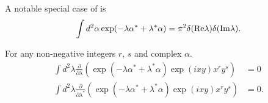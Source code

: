 A notable special case of  is
\[
	\int d^2\alpha \exp(-\lambda \alpha^* + \lambda^* \alpha)
	= \pi^2 \delta(\mathrm{Re} \lambda) \delta(\mathrm{Im} \lambda).
\]

\begin{lemma}
\label{lmm:formalism:c-numbers:zero-integrals}
For any non-negative integers $r$, $s$ and complex $\alpha$.
\begin{equation*}
\begin{split}
	\int d^2\lambda
		\frac{\partial}{\partial \lambda} \left(
			\exp(-\lambda \alpha^* + \lambda^* \alpha)
			\exp(ixy) x^r y^s
		\right)
	& = 0 \\
	\int d^2\lambda
		\frac{\partial}{\partial \lambda^*}
		\left(
			\exp(-\lambda \alpha^* + \lambda^* \alpha)
			\exp(ixy) x^r y^s
		\right)
	& = 0.
\end{split}
\end{equation*}
\end{lemma}
